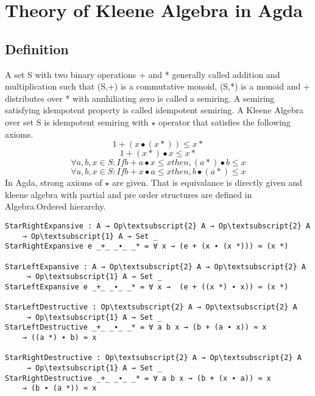 \chapter{Theory of Kleene Algebra in Agda}
\section{Definition}
A set S with two binary operations + and * generally called addition and multiplication such that (S,+) is a commutative monoid, (S,*) is a monoid and + distributes over * with annhiliating zero is called a semiring. A semiring satisfying idempotent property is called idempotent semiring. A Kleene Algebra over set S is idempotent semiring with \( \star \) operator that satisfies the following axioms.
\begin{equation}\label{eq_starrightexpansive}
1 + (x ∙ (x *)) \leq x *
\end{equation}
\begin{equation}\label{eq_starleftexpansive}
1 + (x *) ∙ x \leq x *
\end{equation}
\begin{equation}\label{eq_starleftdestructive}
\forall a, b, x \in S: If b + a  ∙ x \leq x then, (a *)  ∙ b \leq x
\end{equation}
\begin{equation}\label{eq_starrightdestructive}
\forall a, b, x \in S: If b + x  ∙ a \leq x then, b  ∙ (a *) \leq x
\end{equation}
In Agda, strong axioms of \(\star\) are given. That is equivalance is directly given and kleene algebra with partial and pre order structures are defined in Algebra.Ordered hierarchy. 
\begin{Verbatim}
StarRightExpansive : A → Op\textsubscript{2} A → Op\textsubscript{2} A 
	→ Op\textsubscript{1} A → Set _
StarRightExpansive e _+_ _∙_ _* = ∀ x → (e + (x ∙ (x *))) ≈ (x *)

StarLeftExpansive : A → Op\textsubscript{2} A → Op\textsubscript{2} A
	 → Op\textsubscript{1} A → Set _
StarLeftExpansive e _+_ _∙_ _* = ∀ x →  (e + ((x *) ∙ x)) ≈ (x *)

StarLeftDestructive : Op\textsubscript{2} A → Op\textsubscript{2} A
	 → Op\textsubscript{1} A → Set _
StarLeftDestructive _+_ _∙_ _* = ∀ a b x → (b + (a ∙ x)) ≈ x 
	→ ((a *) ∙ b) ≈ x

StarRightDestructive : Op\textsubscript{2} A → Op\textsubscript{2} A
	 → Op\textsubscript{1} A → Set _
StarRightDestructive _+_ _∙_ _* = ∀ a b x → (b + (x ∙ a)) ≈ x 
	→ (b ∙ (a *)) ≈ x
\end{Verbatim}
